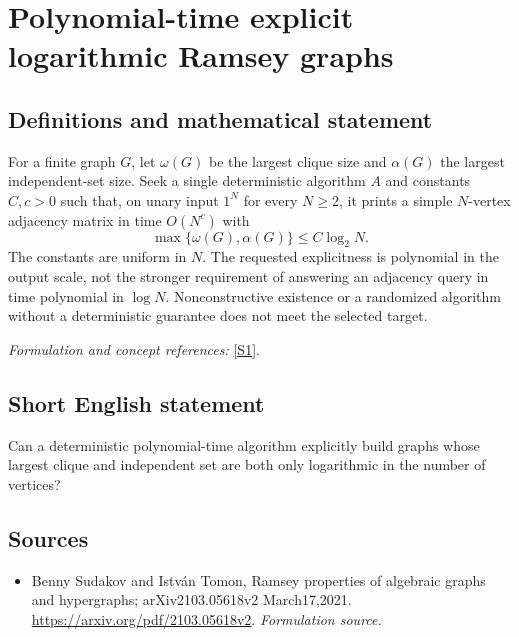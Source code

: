 \documentclass[11pt]{article}
\begin{document}
\section*{\texorpdfstring{Polynomial-time explicit logarithmic Ramsey graphs}{Polynomial-time explicit logarithmic Ramsey graphs}}\label{30006832}
\subsection{Definitions and mathematical statement}
For a finite graph $G$, let $\omega(G)$ be the largest clique size and $\alpha(G)$ the largest independent-set size. Seek a single deterministic algorithm $A$ and constants $C,c>0$ such that, on unary input $1^N$ for every $N\ge2$, it prints a simple $N$-vertex adjacency matrix in time $O(N^c)$ with
\[
 \max\{\omega(G),\alpha(G)\}\le C\log_2N.
\]
The constants are uniform in $N$. The requested explicitness is polynomial in the output scale, not the stronger requirement of answering an adjacency query in time polynomial in $\log N$. Nonconstructive existence or a randomized algorithm without a deterministic guarantee does not meet the selected target.
\par\smallskip\textit{Formulation and concept references:} \href{https://arxiv.org/pdf/2103.05618v2}{[S1]}.

\subsection{Short English statement}
Can a deterministic polynomial-time algorithm explicitly build graphs whose largest clique and independent set are both only logarithmic in the number of vertices?
\subsection{Sources}
\begin{itemize}
\item[S1]Benny Sudakov and István Tomon, Ramsey properties of algebraic graphs and hypergraphs; arXiv2103.05618v2 March17,2021.
\url{https://arxiv.org/pdf/2103.05618v2}.
\textit{Formulation source.}
\end{itemize}
\end{document}
